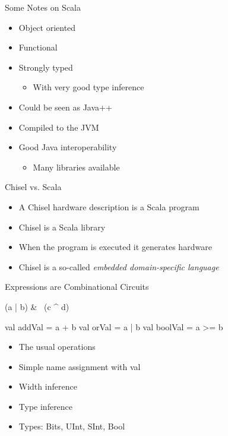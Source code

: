 \documentclass[xcolor=pdflatex,dvipsnames,table]{beamer}
\begin{document}
\begin{frame}[fragile]{Some Notes on Scala}
\begin{itemize}
\item Object oriented
\item Functional
\item Strongly typed
\begin{itemize}
\item With very good type inference
\end{itemize}
\item Could be seen as Java++
\item Compiled to the JVM
\item Good Java interoperability
\begin{itemize}
\item Many libraries available
\end{itemize}
\end{itemize}
\end{frame}

\begin{frame}[fragile]{Chisel vs. Scala}
\begin{itemize}
\item A Chisel hardware description is a Scala program
\item Chisel is a Scala library
\item When the program is executed it generates hardware
\item Chisel is a so-called \emph{embedded domain-specific language}
\end{itemize}
\end{frame}

\begin{frame}[fragile]{Expressions are Combinational Circuits}
\begin{chisel}
(a | b) & ~(c ^ d)

val addVal = a + b
val orVal = a | b
val boolVal = a >= b
\end{chisel}
\begin{itemize}
\item The usual operations 
\item Simple name assignment with val
\item Width inference
\item Type inference
\item Types: Bits, UInt, SInt, Bool
\end{itemize}
\end{frame}
\end{document}
